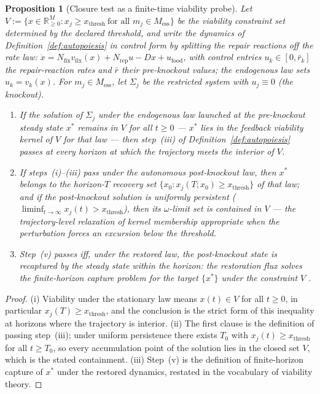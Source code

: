 \documentclass[11pt,a4paper]{article}
\theoremstyle{plain}
\newtheorem{proposition}[theorem]{Proposition}
\theoremstyle{definition}
\theoremstyle{remark}
\newcommand{\RR}{\mathbb{R}}
\begin{document}
\begin{proposition}[Closure test as a finite-time viability probe]
\label{prop:closure-viability}
Let
$V := \{x \in \RR^{M}_{\geq 0} : x_j \geq x_{\mathrm{thresh}}\
\text{for all } m_j \in M_{\mathrm{ess}}\}$
be the viability constraint set determined by the declared threshold,
and write the dynamics of Definition~\ref{def:autopoiesis} in
control form by splitting the repair reactions off the rate law:
$\dot x = N_{\mathrm{fix}} v_{\mathrm{fix}}(x) + N_{\mathrm{rep}} u
- D x + u_{\mathrm{food}}$, with control entries $u_k \in
[0, \bar r_k]$ the repair-reaction rates and $\bar r$ their
pre-knockout values; the \emph{endogenous law} sets $u_k = v_k(x)$.
For $m_j \in M_{\mathrm{ess}}$, let $\Sigma_j$ be the restricted
system with $u_j \equiv 0$ (the knockout).
\begin{enumerate}[label=\textit{(\roman*)},leftmargin=*,itemsep=2pt]
\item If the solution of $\Sigma_j$ under the endogenous law
launched at the pre-knockout steady state $x^*$ remains in $V$ for
all $t \geq 0$ --- $x^*$ lies in the feedback viability kernel of
$V$ for that law --- then step~(iii) of
Definition~\ref{def:autopoiesis} passes at every horizon at which
the trajectory meets the interior of $V$.
\item If steps~(i)--(iii) pass under the autonomous post-knockout
law, then $x^*$ belongs to the horizon-$T$ recovery set
$\{x_0 : x_j(T; x_0) \geq x_{\mathrm{thresh}}\}$ of that law; and if
the post-knockout solution is uniformly persistent
($\liminf_{t \to \infty} x_j(t) > x_{\mathrm{thresh}}$), then its
$\omega$-limit set is contained in $V$ --- the trajectory-level
relaxation of kernel membership appropriate when the perturbation
forces an excursion below the threshold.
\item Step~(v) passes iff, under the restored law, the
post-knockout state is recaptured by the steady state within the
horizon: the restoration flux solves the finite-horizon capture
problem for the target $\{x^*\}$ under the constraint $V$
\citep{aubin2011}.
\end{enumerate}
\end{proposition}

\begin{proof}
(i) Viability under the stationary law means $x(t) \in V$ for all
$t \geq 0$, in particular $x_j(T) \geq x_{\mathrm{thresh}}$, and the
conclusion is the strict form of this inequality at horizons where
the trajectory is interior. (ii) The first clause is the definition
of passing step~(iii); under uniform persistence there exists $T_0$
with $x_j(t) \geq x_{\mathrm{thresh}}$ for all $t \geq T_0$, so
every accumulation point of the solution lies in the closed set
$V$, which is the stated containment. (iii) Step~(v) is the
definition of finite-horizon capture of $x^*$ under the restored
dynamics, restated in the vocabulary of viability theory.
\end{proof}
\end{document}
